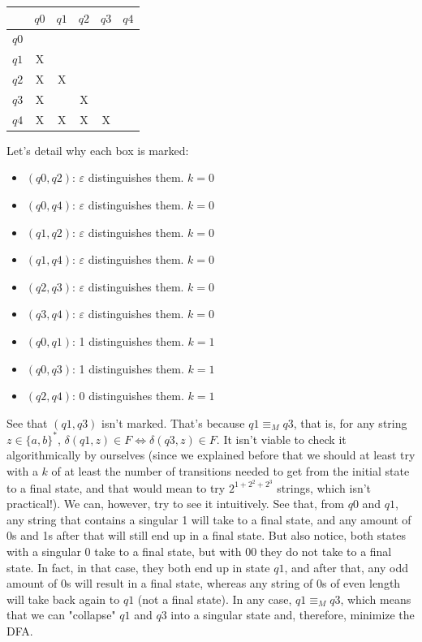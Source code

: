 \documentclass[12pt]{article}
\begin{document}
\begin{center}
\begin{tabular}{|c|c|c|c|c|c|}
    \hline
    & $q0$ & $q1$ & $q2$ & $q3$ & $q4$\\
    \hline
    $q0$ &\cellcolor{pink!50}&\cellcolor{pink!50}&\cellcolor{pink!50}&\cellcolor{pink!50}&\cellcolor{pink!50} \\
    $q1$ & X &\cellcolor{pink!50}&\cellcolor{pink!50}&\cellcolor{pink!50}&\cellcolor{pink!50} \\
    $q2$ & X & X &\cellcolor{pink!50}&\cellcolor{pink!50}&\cellcolor{pink!50} \\
    $q3$ & X & & X &\cellcolor{pink!50}&\cellcolor{pink!50} \\
    $q4$ & X & X & X & X &\cellcolor{pink!50} \\
    \hline
\end{tabular}
\end{center}

Let's detail why each box is marked:

\begin{itemize}
    \item $(q0, q2)$: $\varepsilon$ distinguishes them. $k=0$
    \item $(q0, q4)$: $\varepsilon$ distinguishes them. $k=0$
    \item $(q1, q2)$: $\varepsilon$ distinguishes them. $k=0$
    \item $(q1, q4)$: $\varepsilon$ distinguishes them. $k=0$
    \item $(q2, q3)$: $\varepsilon$ distinguishes them. $k=0$
    \item $(q3, q4)$: $\varepsilon$ distinguishes them. $k=0$
    \item $(q0, q1)$: 1 distinguishes them. $k=1$
    \item $(q0, q3)$: 1 distinguishes them. $k=1$
    \item $(q2, q4)$: 0 distinguishes them. $k=1$
\end{itemize}

See that $(q1, q3)$ isn't marked. That's because $q1 \equiv_M q3$, that is, for any string $z \in \{a, b\}^*$, $\delta(q1, z) \in F \iff \delta(q3, z) \in F$. It isn't viable to check it algorithmically by ourselves (since we explained before that we should at least try with a $k$ of at least the number of transitions needed to get from the initial state to a final state, and that would mean to try $2^{1+2^2+2^3}$ strings, which isn't practical!). We can, however, try to see it intuitively. See that, from $q0$ and $q1$, any string that contains a singular 1 will take to a final state, and any amount of 0s and 1s after that will still end up in a final state. But also notice, both states with a singular 0 take to a final state, but with 00 they do not take to a final state. In fact, in that case, they both end up in state $q1$, and after that, any odd amount of 0s will result in a final state, whereas any string of 0s of even length will take back again to $q1$ (not a final state). In any case, $q1 \equiv_M q3$, which means that we can "collapse" $q1$ and $q3$ into a singular state and, therefore, minimize the DFA.
\end{document}
